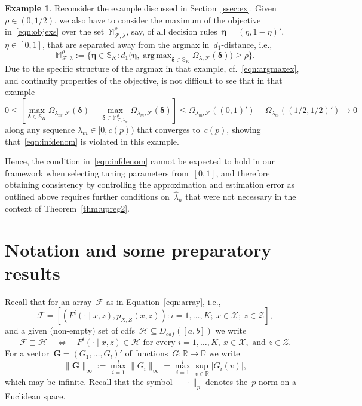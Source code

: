 \documentclass[11pt, a4paper]{article}
\newcommand{\R}{\mathbb{R}}
\DeclareMathOperator*{\argmax}{arg\,max}
\theoremstyle{definition}
\newtheorem{example}{Example}[section]
\begin{document}
\begin{example}\label{ex:ctd}
Reconsider the example discussed in Section~\ref{ssec:ex}. Given~$\rho \in (0, 1/2)$, we also have to consider the maximum of the objective in~\eqref{eqn:objexs} over the set~$\mathbb{M}_{\mathcal{F}, \lambda}^{\rho}$, say, of all decision rules~$\bm{\eta} = (\eta, 1-\eta)'$,~$\eta \in [0, 1]$, that are separated away from the argmax in~$d_1$-distance, i.e., \begin{equation*}
\mathbb{M}_{\mathcal{F}, \lambda}^{\rho} := \big\{\bm{\eta} \in \mathbb{S}_K : d_1\big( 
\bm{\eta},
\argmax_{\bm{\delta} \in \mathbb{S}_K} \Omega_{\lambda, \mathcal{F}}(\bm{\delta})
\big) \geq \rho
\big \}.
\end{equation*} Due to the specific structure of the argmax in that example, cf.~\eqref{eqn:argmaxex}, and continuity properties of the objective, is not difficult to see that in that example
%
\begin{equation*}
0 \leq \left[\max_{\bm{\delta} \in \mathbb{S}_K} \Omega_{\lambda_m, \mathcal{F}}\left(\bm{\delta}\right) - \max_{\bm{\delta} \in \mathbb{M}_{\mathcal{F}, \lambda_m}^{\rho}} \Omega_{\lambda_m, \mathcal{F}}\left(\bm{\delta}\right)\right] \leq \Omega_{\lambda_m, \mathcal{F}}((0, 1)') - \Omega_{\lambda_m}((1/2, 1/2)')\to 0
\end{equation*}
%
along any sequence $\lambda_m \in [0, c(p))$ that converges to~$c(p)$, showing that~\eqref{eqn:infdenom} is violated in this example. \end{example}
%
Hence, the condition in~\eqref{eqn:infdenom} cannot be expected to hold in our framework when selecting tuning parameters from~$[0, 1]$, and therefore obtaining consistency by controlling the approximation and estimation error as outlined above requires further conditions on~$\hat{\lambda}_n$ that were not necessary in the context of Theorem~\ref{thm:upreg2}. 

\section{Notation and some preparatory results}

Recall that for an array~$\mathcal{F}$ as in Equation~\eqref{eqn:array}, i.e.,
\begin{equation*}
\mathcal{F}= \left[(F^i(\cdot\mid x, z), p_{X, Z}(x, z)): i = 1, \hdots, K;~x \in \mathcal{X};~z \in \mathcal{Z}\right],
\end{equation*} 
and a given (non-empty) set of cdfs~$\mathscr{H} \subseteq D_{cdf}([a,b])$ we write~
\begin{equation*}
\mathcal{F} \sqsubset \mathscr{H} \quad \Leftrightarrow \quad  F^i(\cdot \mid x, z) \in \mathscr{H} \text{ for every } i = 1, \hdots, K,~x \in \mathcal{X}, \text{ and } z \in \mathcal{Z}.
\end{equation*}
For a vector~$\bm{G} = (G_1, \hdots, G_l)'$ of functions~$G: \R \to \R$ we write~$$\|\bm{G}\|_{\infty} := \max_{i = 1}^l \|G_i\|_{\infty} = \max_{i = 1}^l \sup_{v \in \R} |G_i(v)|,$$ which may be infinite. Recall that the symbol~$\|\cdot\|_p$ denotes the~$p$-norm on a Euclidean space. 
\end{document}
